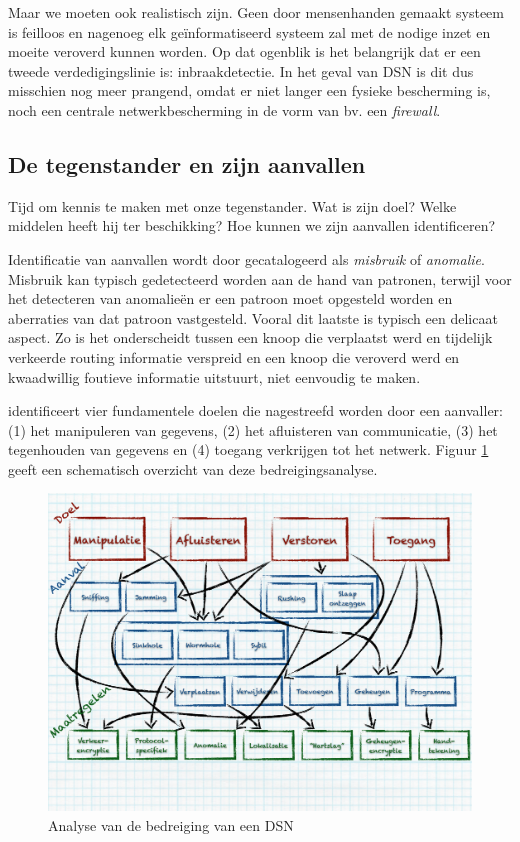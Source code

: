 Maar we moeten ook realistisch zijn. Geen door mensenhanden gemaakt systeem is
feilloos en nagenoeg elk ge\"informatiseerd systeem zal met de nodige inzet en
moeite veroverd kunnen worden. Op dat ogenblik is het belangrijk dat er een
tweede verdedigingslinie is: inbraakdetectie. In het geval van DSN is dit dus
misschien nog meer prangend, omdat er niet langer een fysieke bescherming is,
noch een centrale netwerkbescherming in de vorm van bv. een \emph{firewall}.

\subsection{De tegenstander en zijn aanvallen}

Tijd om kennis te maken met onze tegenstander. Wat is zijn doel? Welke middelen
heeft hij ter beschikking? Hoe kunnen we zijn aanvallen identificeren?

Identificatie van aanvallen wordt door \citep{zhang2000intrusion} gecatalogeerd
als \emph{misbruik} of \emph{anomalie}. Misbruik kan typisch gedetecteerd
worden aan de hand van patronen, terwijl voor het detecteren van anomalie\"en
er een patroon moet opgesteld worden en aberraties van dat patroon vastgesteld.
Vooral dit laatste is typisch een delicaat aspect. Zo is het onderscheidt
tussen een knoop die verplaatst werd en tijdelijk verkeerde routing informatie
verspreid en een knoop die veroverd werd en kwaadwillig foutieve informatie
uitstuurt, niet eenvoudig te maken.

\citep{aschenbruck2012security} identificeert vier fundamentele doelen die
nagestreefd worden door een aanvaller: (1) het manipuleren van gegevens, (2)
het afluisteren van communicatie, (3) het tegenhouden van gegevens en (4)
toegang verkrijgen tot het netwerk. Figuur \ref{fig:wsn-threat-analysis} geeft
een schematisch overzicht van deze bedreigingsanalyse.

\begin{figure}[ht]
  \centering
  \includegraphics[width=0.95\linewidth]{resources/wsn-threat-analysis.pdf}
  \caption{Analyse van de bedreiging van een DSN}
  \label{fig:wsn-threat-analysis}
\end{figure}

